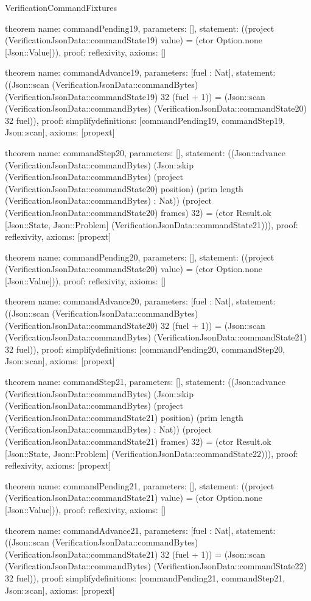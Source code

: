 \begin{lexlean}{VerificationCommandFixtures}
\begin{semanticmodule}
theorem{
  name: commandPending19,
  parameters: [],
  statement: ((project (VerificationJsonData::commandState19) value) = (ctor Option.none [Json::Value])),
  proof: reflexivity{},
  axioms: []
}

theorem{
  name: commandAdvance19,
  parameters: [fuel : Nat],
  statement: ((Json::scan (VerificationJsonData::commandBytes) (VerificationJsonData::commandState19) 32 (fuel + 1)) = (Json::scan (VerificationJsonData::commandBytes) (VerificationJsonData::commandState20) 32 fuel)),
  proof: simplify{definitions: [commandPending19, commandStep19, Json::scan]},
  axioms: [propext]
}

theorem{
  name: commandStep20,
  parameters: [],
  statement: ((Json::advance (VerificationJsonData::commandBytes) (Json::skip (VerificationJsonData::commandBytes) (project (VerificationJsonData::commandState20) position) (prim length (VerificationJsonData::commandBytes) : Nat)) (project (VerificationJsonData::commandState20) frames) 32) = (ctor Result.ok [Json::State, Json::Problem] (VerificationJsonData::commandState21))),
  proof: reflexivity{},
  axioms: [propext]
}

theorem{
  name: commandPending20,
  parameters: [],
  statement: ((project (VerificationJsonData::commandState20) value) = (ctor Option.none [Json::Value])),
  proof: reflexivity{},
  axioms: []
}

theorem{
  name: commandAdvance20,
  parameters: [fuel : Nat],
  statement: ((Json::scan (VerificationJsonData::commandBytes) (VerificationJsonData::commandState20) 32 (fuel + 1)) = (Json::scan (VerificationJsonData::commandBytes) (VerificationJsonData::commandState21) 32 fuel)),
  proof: simplify{definitions: [commandPending20, commandStep20, Json::scan]},
  axioms: [propext]
}

theorem{
  name: commandStep21,
  parameters: [],
  statement: ((Json::advance (VerificationJsonData::commandBytes) (Json::skip (VerificationJsonData::commandBytes) (project (VerificationJsonData::commandState21) position) (prim length (VerificationJsonData::commandBytes) : Nat)) (project (VerificationJsonData::commandState21) frames) 32) = (ctor Result.ok [Json::State, Json::Problem] (VerificationJsonData::commandState22))),
  proof: reflexivity{},
  axioms: [propext]
}

theorem{
  name: commandPending21,
  parameters: [],
  statement: ((project (VerificationJsonData::commandState21) value) = (ctor Option.none [Json::Value])),
  proof: reflexivity{},
  axioms: []
}

theorem{
  name: commandAdvance21,
  parameters: [fuel : Nat],
  statement: ((Json::scan (VerificationJsonData::commandBytes) (VerificationJsonData::commandState21) 32 (fuel + 1)) = (Json::scan (VerificationJsonData::commandBytes) (VerificationJsonData::commandState22) 32 fuel)),
  proof: simplify{definitions: [commandPending21, commandStep21, Json::scan]},
  axioms: [propext]
}


\end{semanticmodule}
\end{lexlean}
